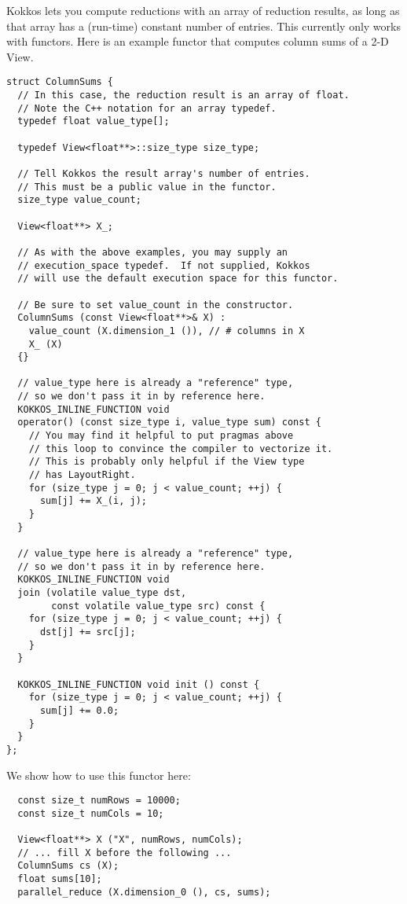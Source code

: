 Kokkos lets you compute reductions with an array of reduction results,
as long as that array has a (run-time) constant number of entries.
This currently only works with functors.  Here is an example functor
that computes column sums of a 2-D View.
\begin{lstlisting}
struct ColumnSums {
  // In this case, the reduction result is an array of float.
  // Note the C++ notation for an array typedef.
  typedef float value_type[];

  typedef View<float**>::size_type size_type;

  // Tell Kokkos the result array's number of entries.
  // This must be a public value in the functor.
  size_type value_count;

  View<float**> X_;

  // As with the above examples, you may supply an
  // execution_space typedef.  If not supplied, Kokkos
  // will use the default execution space for this functor.

  // Be sure to set value_count in the constructor.
  ColumnSums (const View<float**>& X) : 
    value_count (X.dimension_1 ()), // # columns in X
    X_ (X)
  {}

  // value_type here is already a "reference" type,
  // so we don't pass it in by reference here.
  KOKKOS_INLINE_FUNCTION void
  operator() (const size_type i, value_type sum) const {
    // You may find it helpful to put pragmas above
    // this loop to convince the compiler to vectorize it.
    // This is probably only helpful if the View type
    // has LayoutRight.
    for (size_type j = 0; j < value_count; ++j) {
      sum[j] += X_(i, j);
    }
  }

  // value_type here is already a "reference" type,
  // so we don't pass it in by reference here.
  KOKKOS_INLINE_FUNCTION void
  join (volatile value_type dst,
        const volatile value_type src) const {
    for (size_type j = 0; j < value_count; ++j) {
      dst[j] += src[j];
    }
  }

  KOKKOS_INLINE_FUNCTION void init () const {
    for (size_type j = 0; j < value_count; ++j) {
      sum[j] += 0.0;
    }
  }
};
\end{lstlisting}
We show how to use this functor here:
\begin{lstlisting}
  const size_t numRows = 10000;
  const size_t numCols = 10;

  View<float**> X ("X", numRows, numCols);
  // ... fill X before the following ...
  ColumnSums cs (X);
  float sums[10];
  parallel_reduce (X.dimension_0 (), cs, sums);
\end{lstlisting}

